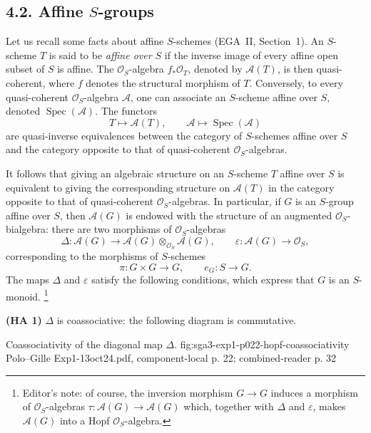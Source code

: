 \subsection*{4.2. Affine \(S\)-groups}

Let us recall some facts about affine \(S\)-schemes (EGA~II, Section~1).
An \(S\)-scheme \(T\) is said to be \emph{affine over \(S\)} if the
inverse image of every affine open subset of \(S\) is affine. The
\(\mathcal O_S\)-algebra \(f_*\mathcal O_T\), denoted by
\(\mathscr A(T)\), is then quasi-coherent, where \(f\) denotes the
structural morphism of \(T\). Conversely, to every quasi-coherent
\(\mathcal O_S\)-algebra \(\mathscr A\), one can associate an
\(S\)-scheme affine over \(S\), denoted \(\operatorname{Spec}(\mathscr A)\).
The functors
\[
  T\longmapsto\mathscr A(T),
  \qquad
  \mathscr A\longmapsto\operatorname{Spec}(\mathscr A)
\]
are quasi-inverse equivalences between the category of \(S\)-schemes
affine over \(S\) and the category opposite to that of quasi-coherent
\(\mathcal O_S\)-algebras.

It follows that giving an algebraic structure on an \(S\)-scheme \(T\)
affine over \(S\) is equivalent to giving the corresponding structure on
\(\mathscr A(T)\) in the category opposite to that of quasi-coherent
\(\mathcal O_S\)-algebras. In particular, if \(G\) is an \(S\)-group
affine over \(S\), then \(\mathscr A(G)\) is endowed with the structure of
an augmented \(\mathcal O_S\)-bialgebra: there are two morphisms of
\(\mathcal O_S\)-algebras
\[
  \Delta:\mathscr A(G)\longrightarrow
    \mathscr A(G)\otimes_{\mathcal O_S}\mathscr A(G),
  \qquad
  \varepsilon:\mathscr A(G)\longrightarrow\mathcal O_S,
\]
corresponding to the morphisms of \(S\)-schemes
\[
  \pi:G\times G\longrightarrow G,
  \qquad
  e_G:S\longrightarrow G.
\]
The maps \(\Delta\) and \(\varepsilon\) satisfy the following conditions,
which express that \(G\) is an \(S\)-monoid.
\footnote{Editor's note: of course, the inversion morphism
\(G\to G\) induces a morphism of \(\mathcal O_S\)-algebras
\(\tau:\mathscr A(G)\to\mathscr A(G)\) which, together with
\(\Delta\) and \(\varepsilon\), makes \(\mathscr A(G)\) into a Hopf
\(\mathcal O_S\)-algebra.}

\medskip
\noindent\textbf{(HA 1)}
\(\Delta\) is coassociative: the following diagram is commutative.

  {Coassociativity of the diagonal map \(\Delta\).}
  {fig:sga3-exp1-p022-hopf-coassociativity}
  {Polo--Gille Exp1-13oct24.pdf, component-local p. 22; combined-reader p. 32}

